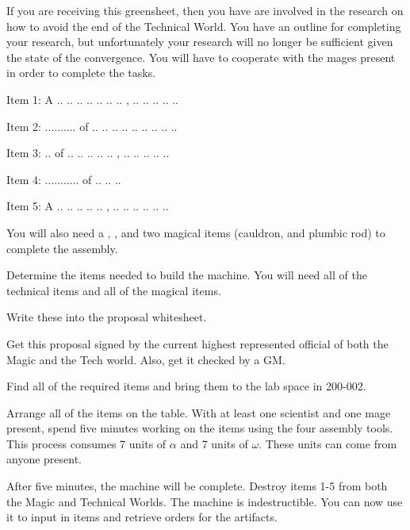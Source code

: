 \documentclass[green]{guildcamp3}
\begin{document}
\name{\gSaveTheWorldScientists{}}






If you are receiving this greensheet, then you have are involved in the research on how to avoid the end of the Technical World. You have an outline for completing your research, but unfortunately your research will no longer be sufficient given the state of the convergence. You will have to cooperate with the mages present in order to complete the tasks. 

Item 1: A .. .. .. .. .. .. .. , .. .. .. .. ..

Item 2: .......... of .. .. .. .. .. .. .. .. ..

Item 3: .. of .. .. .. .. ..  ,  .. .. .. .. ..

Item 4: ........... of .. .. .. 

Item 5: A .. .. .. .. ..  ,  .. .. .. .. .. ..

You will also need a \iMultitool{}, \iScrewdriver{}, and two magical items (cauldron, and plumbic rod) to complete the assembly. 


\begin{enum}[Directions]
	\item Determine the items needed to build the machine. You will need all of the technical items and all of the magical items. 
	\item Write these into the proposal whitesheet. 
	\item Get this proposal signed by the current highest represented official of both the Magic and the Tech world. Also, get it checked by a GM.
	\item Find all of the required items and bring them to the lab space in 200-002.
	\item Arrange all of the items on the table. With at least one scientist and one mage present, spend five minutes working on the items using the four assembly tools. This process consumes 7 units of $\alpha$ and 7 units of $\omega$. These units can come from anyone present. 
	\item After five minutes, the machine will be complete. Destroy items 1-5 from both the Magic and Technical Worlds. The machine is indestructible. You can now use it to input in items and retrieve orders for the artifacts. 
	
\end{enum}
\end{document}
